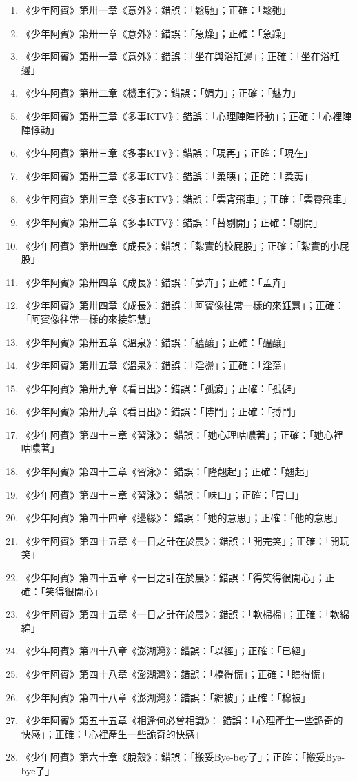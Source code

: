 \begin{enumerate}
\item 《少年阿賓》第卅一章《意外》：錯誤：「鬆馳」；正確：「鬆弛」
\item 《少年阿賓》第卅一章《意外》：錯誤：「急燥」；正確：「急躁」
\item 《少年阿賓》第卅一章《意外》：錯誤：「坐在與浴缸邊」；正確：「坐在浴缸邊」
\item 《少年阿賓》第卅二章《機車行》：錯誤：「媚力」；正確：「魅力」
\item 《少年阿賓》第卅三章《多事KTV》：錯誤：「心理陣陣悸動」；正確：「心裡陣陣悸動」
\item 《少年阿賓》第卅三章《多事KTV》：錯誤：「現再」；正確：「現在」
\item 《少年阿賓》第卅三章《多事KTV》：錯誤：「柔胰」；正確：「柔荑」
\item 《少年阿賓》第卅三章《多事KTV》：錯誤：「雲宵飛車」；正確：「雲霄飛車」
\item 《少年阿賓》第卅三章《多事KTV》：錯誤：「替剔開」；正確：「剔開」
\item 《少年阿賓》第卅四章《成長》：錯誤：「紮實的校屁股」；正確：「紮實的小屁股」
\item 《少年阿賓》第卅四章《成長》：錯誤：「夢卉」；正確：「孟卉」
\item 《少年阿賓》第卅四章《成長》：錯誤：「阿賓像往常一樣的來鈺慧」；正確：「阿賓像往常一樣的來接鈺慧」
\item 《少年阿賓》第卅五章《溫泉》：錯誤：「蘊釀」；正確：「醞釀」
\item 《少年阿賓》第卅五章《溫泉》：錯誤：「淫盪」；正確：「淫蕩」
\item 《少年阿賓》第卅九章《看日出》：錯誤：「孤癖」；正確：「孤僻」
\item 《少年阿賓》第卅九章《看日出》：錯誤：「博鬥」；正確：「搏鬥」
\item 《少年阿賓》第四十三章《習泳》： 錯誤：「她心理咕噥著」；正確：「她心裡咕噥著」
\item 《少年阿賓》第四十三章《習泳》： 錯誤：「隆翹起」；正確：「翹起」
\item 《少年阿賓》第四十三章《習泳》： 錯誤：「味口」；正確：「胃口」
\item 《少年阿賓》第四十四章《邊緣》： 錯誤：「她的意思」；正確：「他的意思」
\item 《少年阿賓》第四十五章《一日之計在於晨》：錯誤：「開完笑」；正確：「開玩笑」
\item 《少年阿賓》第四十五章《一日之計在於晨》：錯誤：「得笑得很開心」；正確：「笑得很開心」
\item 《少年阿賓》第四十五章《一日之計在於晨》：錯誤：「軟棉棉」；正確：「軟綿綿」
\item《少年阿賓》第四十八章《澎湖灣》：錯誤：「以經」；正確：「已經」
\item《少年阿賓》第四十八章《澎湖灣》：錯誤：「橋得慌」；正確：「瞧得慌」
\item《少年阿賓》第四十八章《澎湖灣》：錯誤：「綿被」；正確：「棉被」
\item 《少年阿賓》第五十五章《相逢何必曾相識》： 錯誤：「心理產生一些詭奇的快感」；正確：「心裡產生一些詭奇的快感」
\item 《少年阿賓》第六十章《脫殼》：錯誤：「搬妥Bye-bey了」；正確：「搬妥Bye-bye了」
\end{enumerate}

